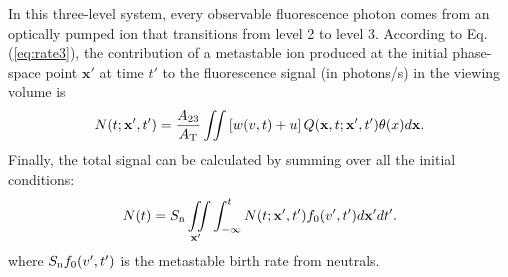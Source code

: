 \documentclass[aip,pop,reprint]{revtex4-1}
\begin{document}


In this three-level system, every observable fluorescence photon comes from an optically pumped ion that transitions from level 2 to level 3. According to Eq. (\ref{eq:rate3}), the contribution of a metastable ion produced at the initial phase-space point $\mathbf{x'}$ at time $t'$ to the fluorescence signal (in photons/s) in the viewing volume is
\begin{equation}
\label{eq:signal}
N (t;\mathbf{x'},t')=\frac{A_{23}}{A_\textup{T}}\iint\left [w(v,t)+u \right ]Q(\mathbf{x},t;\mathbf{x'},t')\theta (x)d\mathbf{x}.
\end{equation}
Finally, the total signal can be calculated by summing over all the initial conditions: 
\begin{equation}
\label{eq:finalsignal}
N (t)=S_\textup{n}\iint\limits_{\mathbf{x'}}\int_{-\infty}^{t}N ( t;\mathbf{x'},t')f_0(v',t')d\mathbf{x'}dt'.
\end{equation}
where $S_\textup{n}f_0(v',t')$ is the metastable birth rate from neutrals.
\end{document}
